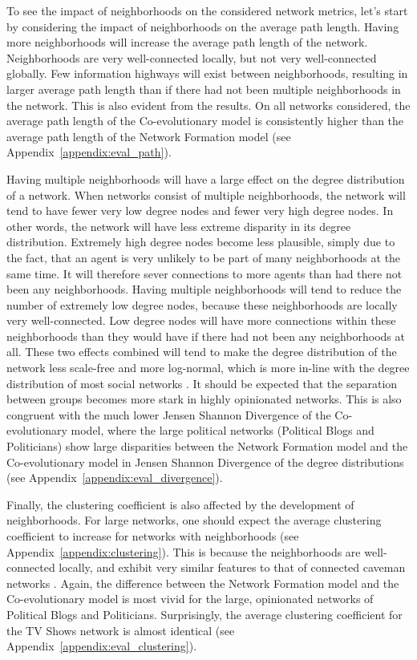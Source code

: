 \documentclass[11pt]{article}
\begin{document}
To see the impact of neighborhoods on the considered network metrics, let's start by considering the impact of neighborhoods on the average path length. Having more neighborhoods will increase the average path length of the network. Neighborhoods are very well-connected locally, but not very well-connected globally. Few information highways will exist between neighborhoods, resulting in larger average path length than if there had not been multiple neighborhoods in the network. This is also evident from the results. On all networks considered, the average path length of the Co-evolutionary model is consistently higher than the average path length of the Network Formation model (see Appendix~\ref{appendix:eval_path}).

Having multiple neighborhoods will have a large effect on the degree distribution of a network. When networks consist of multiple neighborhoods, the network will tend to have fewer very low degree nodes and fewer very high degree nodes. In other words, the network will have less extreme disparity in its degree distribution. Extremely high degree nodes become less plausible, simply due to the fact, that an agent is very unlikely to be part of many neighborhoods at the same time. It will therefore sever connections to more agents than had there not been any neighborhoods. Having multiple neighborhoods will tend to reduce the number of extremely low degree nodes, because these neighborhoods are locally very well-connected. Low degree nodes will have more connections within these neighborhoods than they would have if there had not been any neighborhoods at all. 
These two effects combined will tend to make the degree distribution of the network less scale-free and more log-normal, which is more in-line with the degree distribution of most social networks \cite{broido_scale-free_2019}. It should be expected that the separation between groups becomes more stark in highly opinionated networks. This is also congruent with the much lower Jensen Shannon Divergence of the Co-evolutionary model, where the large political networks (Political Blogs and Politicians) show large disparities between the Network Formation model and the Co-evolutionary model in Jensen Shannon Divergence of the degree distributions (see Appendix~\ref{appendix:eval_divergence}).

Finally, the clustering coefficient is also affected by the development of neighborhoods. For large networks, one should expect the average clustering coefficient to increase for networks with neighborhoods (see Appendix~\ref{appendix:clustering}). This is because the neighborhoods are well-connected locally, and exhibit very similar features to that of connected caveman networks \cite{watts_networks_1999}. Again, the difference between the Network Formation model and the Co-evolutionary model is most vivid for the large, opinionated networks of Political Blogs and Politicians. Surprisingly, the average clustering coefficient for the TV Shows network is almost identical (see Appendix~\ref{appendix:eval_clustering}).
\end{document}
